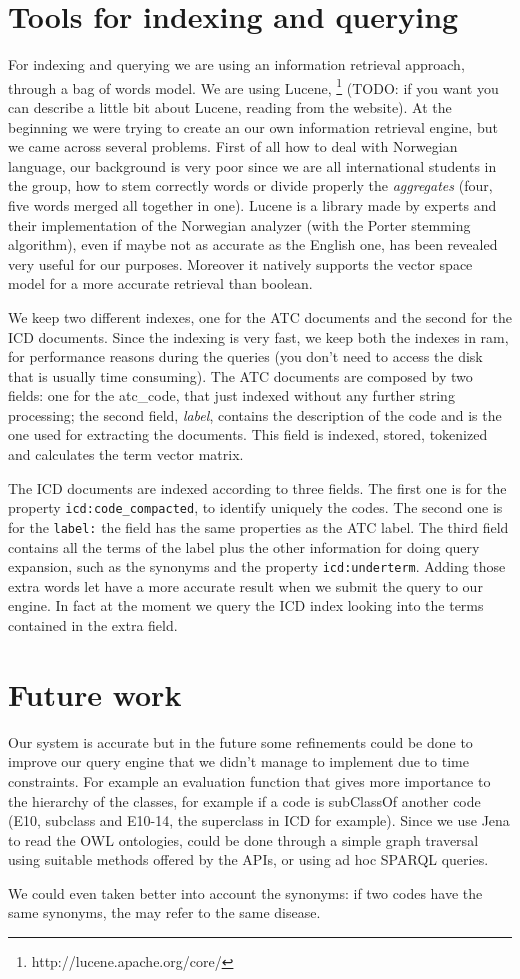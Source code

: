 \documentclass{article}
\begin{document}
\section{Tools for indexing and querying}
For indexing and querying we are using an information retrieval approach, through a bag of words model. We are using Lucene, \footnote{http://lucene.apache.org/core/}  (TODO: if you want you can describe a little bit about Lucene, reading from the website). At the beginning we were trying to create an our own information retrieval engine, but we came across several problems. First of all how to deal with Norwegian language, our background is very poor since we are all international students in the group, how to stem correctly words or divide properly the \emph{aggregates} (four, five words merged all together in one). Lucene is a library made by experts and their implementation of the Norwegian analyzer (with the Porter stemming algorithm), even if maybe not as accurate as the English one, has been revealed very useful for our purposes. Moreover it natively supports the vector space model for a more accurate retrieval than boolean.

We keep two different indexes, one for the ATC documents and the second for the ICD documents. Since the indexing is very fast, we keep both the indexes in ram, for performance reasons during the queries (you don't need to access the disk that is usually time consuming). The ATC documents are composed by two fields: one for the atc\_code, that just indexed without any further string processing; the second field, \emph{label}, contains the description of the code and is the one used for extracting the documents. This field is indexed, stored, tokenized and calculates the term vector matrix.

The ICD documents are indexed according to three fields. The first one is for the property \texttt{icd:code\_compacted}, to identify uniquely the codes. The second one is for the \texttt{label:} the field has the same properties as the ATC label. The third field contains all the terms of the label plus the other information for doing query expansion, such as the synonyms and the property \texttt{icd:underterm}. Adding those extra words let have a more accurate result when we submit the query to our engine. In fact at the moment we query the ICD index looking into the terms contained in the extra field.


\section{Future work}
Our system is accurate but in the future some refinements could be done to improve our query engine that we didn't manage to implement due to time constraints. For example an evaluation function that gives more  importance to the hierarchy of the classes, for example if a code is subClassOf another code (E10, subclass and E10-14, the superclass in ICD for example). Since we use Jena to read the OWL ontologies, could be done through a simple graph traversal using suitable methods offered by the APIs, or using ad hoc SPARQL queries.

We could even taken better into account the synonyms: if two codes have the same synonyms, the may refer to the same disease.
\end{document}

